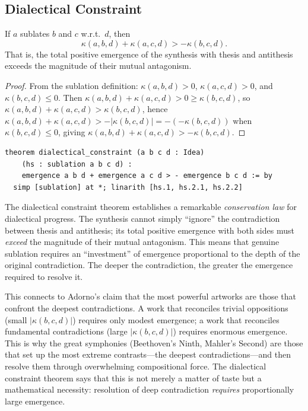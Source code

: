 \subsection{Dialectical Constraint}

\begin{theorem}
\label{thm:dialectical-constraint}
If $a$ sublates $b$ and $c$ w.r.t.\ $d$, then
\[
  \kappa(a, b, d) + \kappa(a, c, d) > -\kappa(b, c, d).
\]
That is, the total positive emergence of the synthesis with thesis and
antithesis exceeds the magnitude of their mutual antagonism.
\end{theorem}

\begin{proof}
From the sublation definition: $\kappa(a, b, d) > 0$, $\kappa(a, c, d) > 0$,
and $\kappa(b, c, d) \leq 0$.  Then
$\kappa(a, b, d) + \kappa(a, c, d) > 0 \geq \kappa(b, c, d)$, so
$\kappa(a, b, d) + \kappa(a, c, d) > \kappa(b, c, d)$, hence
$\kappa(a, b, d) + \kappa(a, c, d) > -|\kappa(b, c, d)| = -(-\kappa(b,c,d))$
when $\kappa(b,c,d) \leq 0$, giving $\kappa(a, b, d) + \kappa(a, c, d) > -\kappa(b, c, d)$.
\end{proof}

\begin{lstlisting}
theorem dialectical_constraint (a b c d : Idea)
    (hs : sublation a b c d) :
    emergence a b d + emergence a c d > - emergence b c d := by
  simp [sublation] at *; linarith [hs.1, hs.2.1, hs.2.2]
\end{lstlisting}

\begin{interpretation}
\label{interp:dialectical-conservation}
The dialectical constraint theorem establishes a remarkable \emph{conservation law} for dialectical progress.  The synthesis cannot simply ``ignore'' the contradiction between thesis and antithesis; its total positive emergence with both sides must \emph{exceed} the magnitude of their mutual antagonism.  This means that genuine sublation requires an ``investment'' of emergence proportional to the depth of the original contradiction.  The deeper the contradiction, the greater the emergence required to resolve it.

This connects to Adorno's claim that the most powerful artworks are those that confront the deepest contradictions.  A work that reconciles trivial oppositions (small $|\kappa(b, c, d)|$) requires only modest emergence; a work that reconciles fundamental contradictions (large $|\kappa(b, c, d)|$) requires enormous emergence.  This is why the great symphonies (Beethoven's Ninth, Mahler's Second) are those that set up the most extreme contrasts---the deepest contradictions---and then resolve them through overwhelming compositional force.  The dialectical constraint theorem says that this is not merely a matter of taste but a mathematical necessity: resolution of deep contradiction \emph{requires} proportionally large emergence.
\end{interpretation}

